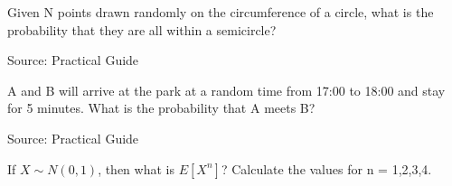 \begin{exe}
Given N points drawn randomly on the circumference of a circle, what is the probability that they are all within a semicircle?
\end{exe}
Source: Practical Guide
\begin{teacher}
\begin{sol}
\end{sol}
\end{teacher}

\begin{exe}
A and B will arrive at the park at a random time from 17:00 to 18:00 and stay for 5 minutes. What is the probability that A meets B?
\end{exe}
Source: Practical Guide
\begin{teacher}
\begin{sol}
\end{sol}
\end{teacher}

\begin{exe}
If $X \sim N(0,1)$, then what is $E[X^n]$? Calculate the values for n = 1,2,3,4.
\end{exe}
\begin{teacher}
\begin{sol}
\end{sol}
\end{teacher}









